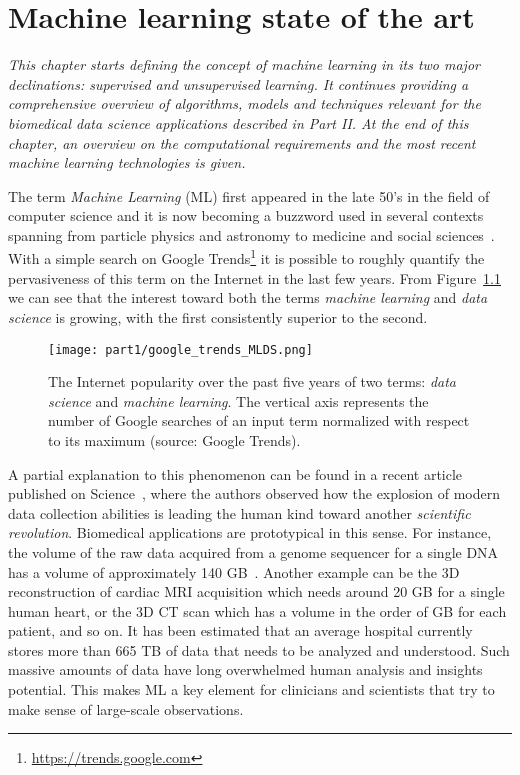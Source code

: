 
\chapter{Machine learning state of the art} \label{chap:state-of-the-art}

\begin{displayquote}
	\textit{This chapter starts defining the concept of machine learning in its two major declinations: supervised and unsupervised learning. It continues providing a comprehensive overview  of algorithms, models and techniques relevant for the biomedical data science applications described in Part II. At the end of this chapter, an overview on the computational requirements and the most recent machine learning technologies is given.}
\end{displayquote}

The term \textit{Machine Learning} (ML) first appeared in the late 50's in the field of computer science and it is now becoming a buzzword used in several contexts spanning from particle physics and astronomy to medicine and social sciences~\cite{service2017ai}.
With a simple search on Google Trends\footnote{\url{https://trends.google.com}} it is possible to roughly quantify the pervasiveness of this term on the Internet in the last few years. From Figure~\ref{fig:google_trend_ML} we can see that the interest toward both the terms \textit{machine learning} and \textit{data science} is growing, with the first consistently superior to the second.

\begin{figure}[h!]
  \centering
    \texttt{[image: part1/google\_trends\_MLDS.png]}
  \caption{The Internet popularity over the past five years of two terms: \textit{data science} and \textit{machine learning}. The vertical axis represents the number of Google searches of an input term normalized with respect to its maximum (source: Google Trends).} \label{fig:google_trend_ML}
\end{figure}

A partial explanation to this phenomenon can be found in a recent article published on Science~\cite{appenzeller2017revolution}, where the authors observed how the explosion of modern data collection abilities is leading the human kind toward another \textit{scientific revolution}.
Biomedical applications are prototypical in this sense. For instance, the volume of the raw data acquired from a genome sequencer for a single \ac{DNA} has a volume of approximately 140 GB~\cite{marx2013biology}. Another example can be the 3D reconstruction of cardiac MRI acquisition which needs around 20 GB for a single human heart, or the 3D \ac{CT} scan which has a volume in the order of GB for each patient, and so on. It has been estimated that an average hospital currently stores more than 665 TB of data that needs to be analyzed and understood.
Such massive amounts of data have long overwhelmed human analysis and insights potential. This makes ML a key element for clinicians and scientists that try to make sense of large-scale observations.

